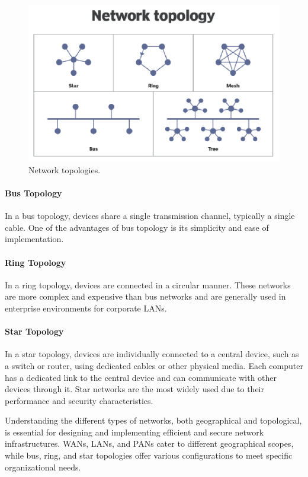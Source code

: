 \begin{figure}[h]
    \centering
    \includegraphics[width=\textwidth]{images/network_topology.png}
    \caption{Network topologies.}
    \label{fig:net_topo}
\end{figure}

\paragraph{Bus Topology}
In a bus topology, devices share a single transmission channel, typically a single cable. One of the advantages of bus topology is its simplicity and ease of implementation.

\paragraph{Ring Topology}
In a ring topology, devices are connected in a circular manner. These networks are more complex and expensive than bus networks and are generally used in enterprise environments for corporate LANs.

\paragraph{Star Topology}
In a star topology, devices are individually connected to a central device, such as a switch or router, using dedicated cables or other physical media. Each computer has a dedicated link to the central device and can communicate with other devices through it. Star networks are the most widely used due to their performance and security characteristics.

Understanding the different types of networks, both geographical and topological, is essential for designing and implementing efficient and secure network infrastructures. WANs, LANs, and PANs cater to different geographical scopes, while bus, ring, and star topologies offer various configurations to meet specific organizational needs.


